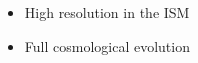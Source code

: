 \documentclass[a4paper,fleqn,usenatbib]{mnras}
\begin{document}
\begin{itemize}
    \item High resolution in the ISM
    \item Full cosmological evolution
\end{itemize}

\end{document}
